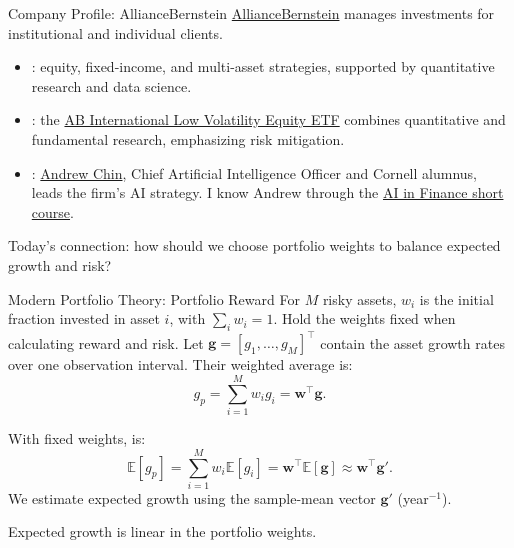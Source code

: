\documentclass[aspectratio=169,11pt]{beamer}
\newcommand{\E}{\mathbb{E}}
\newcommand{\bw}{\mathbf{w}}
\newcommand{\bg}{\mathbf{g}}
\begin{document}
\begin{frame}{Company Profile: AllianceBernstein}
  \href{https://www.alliancebernstein.com/corporate/en/home/about-us.html}{AllianceBernstein}
  manages investments for institutional and individual clients.

  \vspace{0.4em}
  \begin{itemize}\setlength{\itemsep}{0.5em}
    \item {}: equity, fixed-income, and multi-asset
      strategies, supported by quantitative research and data science.
    \item {}: the
      \href{https://www.alliancebernstein.com/us/en-us/investments/products/etf/equities/ab-international-low-volatility-equity-etf.html}{AB International Low Volatility Equity ETF}
      combines quantitative and fundamental research, emphasizing risk mitigation.
    \item {}:
      \href{https://www.linkedin.com/in/andrewchin17/}{Andrew Chin}, Chief Artificial
      Intelligence Officer and Cornell alumnus, leads the firm's AI strategy.
      I know Andrew through the
      \href{https://ecornell.cornell.edu/certificates/ai/ai-in-finance/}{AI in Finance short course}.
  \end{itemize}

  \vspace{0.5em}
  Today's connection: how should we choose portfolio weights to balance
  expected growth and risk?
\end{frame}

\begin{frame}{Modern Portfolio Theory: Portfolio Reward}
  For $M$ risky assets, $w_i$ is the initial fraction invested in asset $i$,
  with $\sum_iw_i=1$. Hold the weights fixed when calculating reward and risk.
  Let $\bg=[g_1,\ldots,g_M]^{\top}$ contain the asset growth rates over
  one observation interval. Their weighted average is:
  \[
    g_p=\sum_{i=1}^{M}w_i g_i=\bw^{\top}\bg.
  \]

  With fixed weights,  is:
  \[
    \boxed{\E[g_p]=\sum_{i=1}^{M}w_i\E[g_i]
      =\bw^{\top}\E[\bg]\approx\bw^{\top}\bg'}.
  \]
  We estimate expected growth using the sample-mean vector $\bg'$
  (year$^{-1}$).

  \vspace{0.5em}
  Expected growth is linear in the portfolio weights.
\end{frame}
\end{document}
